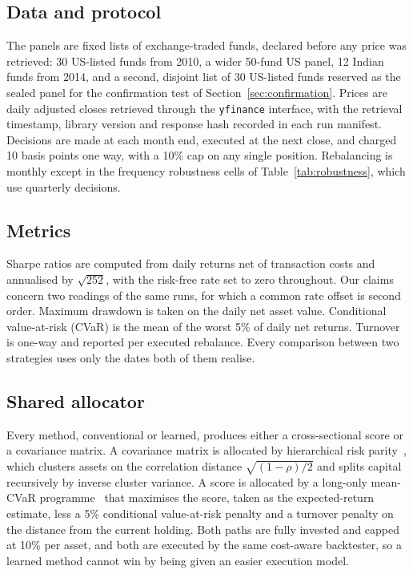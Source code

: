\documentclass[sigconf,nonacm]{acmart}
\begin{document}
\subsection{Data and protocol}
The panels are fixed lists of exchange-traded funds, declared before any price
was retrieved: 30 US-listed funds from 2010, a wider 50-fund US panel, 12 Indian
funds from 2014, and a second, disjoint list of 30 US-listed funds reserved as
the sealed panel for the confirmation test of
Section~\ref{sec:confirmation}. Prices are daily adjusted closes retrieved through the \texttt{yfinance}
interface, with the retrieval timestamp, library version and response hash
recorded in each run manifest. Decisions are made at each month end, executed at the next close, and
charged 10 basis points one way, with a 10\% cap on any single position.
Rebalancing is monthly except in the frequency robustness cells of
Table~\ref{tab:robustness}, which use quarterly decisions.

\subsection{Metrics}
Sharpe ratios are computed from daily returns net of
transaction costs and annualised by $\sqrt{252}$, with the risk-free rate set to
zero throughout. Our claims concern two readings of the same runs, for which a
common rate offset is second order. Maximum drawdown is taken on the daily
net asset value. Conditional value-at-risk (CVaR) is the mean of the worst 5\% of daily
net returns. Turnover is one-way and reported per executed rebalance. Every
comparison between two strategies uses only the dates both of them realise.

\subsection{Shared allocator}
Every method, conventional or learned,
produces either a cross-sectional score or a covariance matrix. A covariance
matrix is allocated by hierarchical risk parity~\cite{lopezdeprado2016hrp},
which clusters assets on the correlation distance $\sqrt{(1-\rho)/2}$ and splits
capital recursively by inverse cluster variance. A score is allocated by a
long-only mean-CVaR programme~\cite{rockafellar2000cvar} that maximises the
score, taken as the expected-return estimate, less a 5\% conditional
value-at-risk penalty and a turnover penalty on the distance from the current
holding. Both paths are fully invested and capped at
10\% per asset, and both are executed by the same cost-aware backtester, so a
learned method cannot win by being given an easier execution model.
\end{document}
